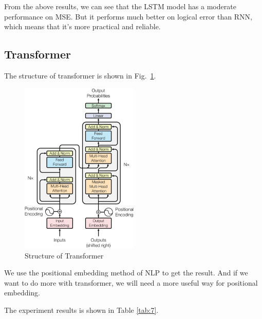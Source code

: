 \documentclass[runningheads]{llncs}
\begin{document}
From the above results, we can see that the LSTM model has a moderate performance on MSE. But it performs much better on logical error than RNN, which means that it's more practical and reliable.

\subsection{Transformer}

The structure of transformer\cite{vaswani2017attention} is shown in Fig.~\ref{fig:18}.


\begin{figure}[htbp]
    \centering
    \includegraphics[width=0.5\textwidth]{../img/dl/4.png}
    \caption{Structure of Transformer}
    \label{fig:18}
\end{figure}

We use the positional embedding method of NLP to get the result. And if we want to do more with transformer, we will need a more useful way for positional embedding. 

The experiment results is shown in Table \ref{tab:7}.

\end{document}
